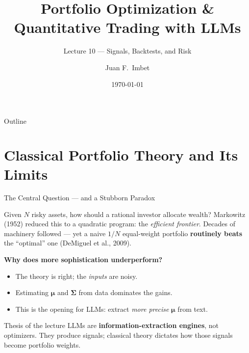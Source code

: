 \documentclass[9pt,t]{beamer}
\title{Portfolio Optimization \& Quantitative Trading with LLMs}
\subtitle{Lecture 10 --- Signals, Backtests, and Risk}
\author{Juan F.\ Imbet}
\institute{Paris Dauphine -- PSL University}
\date{\today}
\begin{document}
\begin{frame}\titlepage\end{frame}

\begin{frame}{Outline}\tableofcontents\end{frame}

\section{Classical Portfolio Theory and Its Limits}

\begin{frame}{The Central Question --- and a Stubborn Paradox}
\begin{bigpicture}
Given $N$ risky assets, how should a rational investor allocate wealth?
Markowitz (1952) reduced this to a quadratic program: the \emph{efficient frontier}.
Decades of machinery followed --- yet a naive $1/N$ equal-weight portfolio
\textbf{routinely beats} the ``optimal'' one (DeMiguel et al., 2009).
\end{bigpicture}

\medskip
\textbf{Why does more sophistication underperform?}
\begin{itemize}
  \item The theory is right; the \emph{inputs} are noisy.
  \item Estimating $\boldsymbol{\mu}$ and $\boldsymbol{\Sigma}$ from data dominates the gains.
  \item This is the opening for LLMs: extract \emph{more precise} $\boldsymbol{\mu}$ from text.
\end{itemize}

\medskip
\begin{block}{Thesis of the lecture}
LLMs are \textbf{information-extraction engines}, not optimizers. They produce
signals; classical theory dictates how those signals become portfolio weights.
\end{block}
\end{frame}
\end{document}

